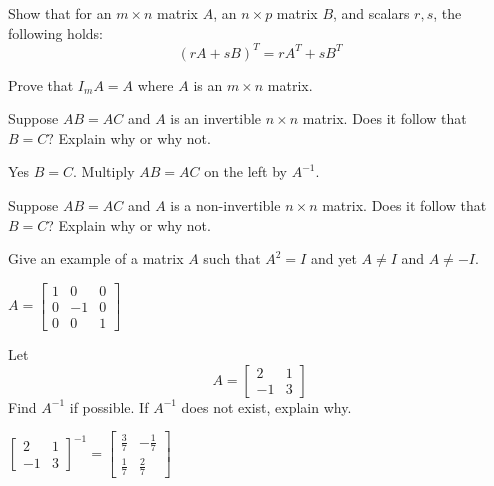 \documentclass{ximera}
\begin{document}
\begin{problem}\label{prb:4.30} Show that for an $m \times n$ matrix $A$, an $n \times p$ matrix $B$, and scalars $r, s$, the following holds:
\[
\left( rA + sB \right) ^T = rA^{T} + sB^{T}
\]
\end{problem}

\begin{problem}\label{prb:4.31} Prove that $I_{m}A=A$ where $A$ is an $m\times n$ matrix.
\end{problem}

\begin{problem}\label{prb:4.32} Suppose $AB=AC$ and $A$ is an invertible $n\times n$ matrix. Does it
follow that $B=C?$ Explain why or why not.
\begin{hint}
Yes $B=C$. Multiply $AB = AC$ on the left by $A^{-1}$.
\end{hint}
\end{problem}

\begin{problem}\label{prb:4.33} Suppose $AB=AC$ and $A$ is a non-invertible $n\times n$ matrix. Does it follow that $B=C$? Explain why or why not.
\end{problem}

\begin{problem}\label{prb:4.34} Give an example of a matrix $A$ such that $A^{2}=I$ and yet $A\neq I$
and $A\neq -I.$
\begin{hint}
$A = \left[
\begin{array}{rrr}
1 & 0 & 0 \\
0 & -1 & 0 \\
0 & 0 & 1
\end{array}
\right] $
\end{hint}
\end{problem}

\begin{problem}\label{prb:4.35} Let
\begin{equation*}
A=\left[
\begin{array}{rr}
2 & 1 \\
-1 & 3
\end{array}
\right]
\end{equation*}
Find $A^{-1}$ if possible. If $A^{-1}$ does not exist, explain why.
\begin{hint}
$\left[
\begin{array}{rr}
2 & 1 \\
-1 & 3
\end{array}
\right]^{-1}= \left[
\begin{array}{rr}
 \frac{3}{7} & - \frac{1}{7} \\
 \frac{1}{7} &  \frac{2}{7}
\end{array}
\right]$
\end{hint}
\end{problem}
\end{document}
